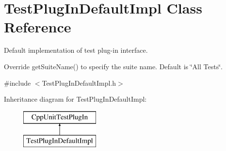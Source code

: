 \hypertarget{class_test_plug_in_default_impl}{\section{Test\-Plug\-In\-Default\-Impl Class Reference}
\label{class_test_plug_in_default_impl}
}


Default implementation of test plug-\/in interface.

Override get\-Suite\-Name() to specify the suite name. Default is \char`\"{}\-All Tests\char`\"{}.  




{\ttfamily \#include $<$Test\-Plug\-In\-Default\-Impl.\-h$>$}

Inheritance diagram for Test\-Plug\-In\-Default\-Impl\-:\begin{figure}[H]
\begin{center}
\leavevmode
\includegraphics[height=2.000000cm]{class_test_plug_in_default_impl}
\end{center}
\end{figure}
